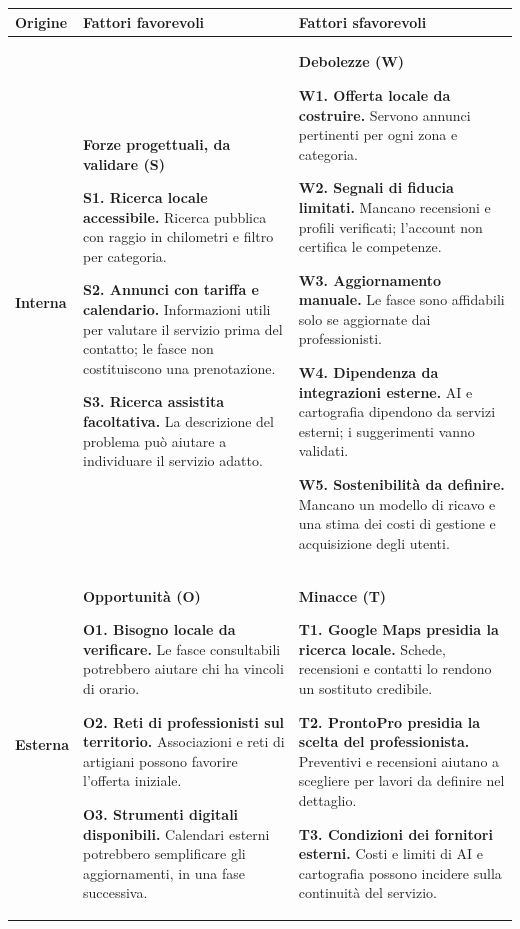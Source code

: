 \documentclass[a4paper]{article}
\begin{document}
\medskip
{\small
\begin{tabularx}{\linewidth}{@{}L{1.5cm}YY@{}}
  \textbf{Origine} & \textbf{Fattori favorevoli} & \textbf{Fattori sfavorevoli} \\
  \hline
  \textbf{Interna} &
  \textbf{Forze progettuali, da validare (S)}\par
  \textbf{S1. Ricerca locale accessibile.} Ricerca pubblica con raggio in chilometri e filtro per categoria.\par
  \textbf{S2. Annunci con tariffa e calendario.} Informazioni utili per valutare il servizio prima del contatto;
  le fasce non costituiscono una prenotazione.\par
  \textbf{S3. Ricerca assistita facoltativa.} La descrizione del problema può aiutare a individuare il servizio adatto.
  &
  \textbf{Debolezze (W)}\par
  \textbf{W1. Offerta locale da costruire.} Servono annunci pertinenti per ogni zona e categoria.\par
  \textbf{W2. Segnali di fiducia limitati.} Mancano recensioni e profili verificati; l'account non certifica le competenze.\par
  \textbf{W3. Aggiornamento manuale.} Le fasce sono affidabili solo se aggiornate dai professionisti.\par
  \textbf{W4. Dipendenza da integrazioni esterne.} AI e cartografia dipendono da servizi esterni; i suggerimenti vanno validati.\par
  \textbf{W5. Sostenibilità da definire.} Mancano un modello di ricavo
  e una stima dei costi di gestione e acquisizione degli utenti.
  \\
  \hline
  \textbf{Esterna} &
  \textbf{Opportunità (O)}\par
  \textbf{O1. Bisogno locale da verificare.} Le fasce consultabili potrebbero aiutare chi ha vincoli di orario.\par
  \textbf{O2. Reti di professionisti sul territorio.} Associazioni e reti di artigiani possono favorire l'offerta iniziale.\par
  \textbf{O3. Strumenti digitali disponibili.} Calendari esterni potrebbero semplificare gli aggiornamenti, in una fase successiva.
  &
  \textbf{Minacce (T)}\par
  \textbf{T1. Google Maps presidia la ricerca locale.} Schede, recensioni e contatti lo rendono un sostituto credibile.\par
  \textbf{T2. ProntoPro presidia la scelta del professionista.} Preventivi e recensioni aiutano a scegliere per lavori da definire nel dettaglio.\par
  \textbf{T3. Condizioni dei fornitori esterni.} Costi e limiti di AI e cartografia possono incidere sulla continuità del servizio.
  \\
\end{tabularx}\par}
\end{document}
